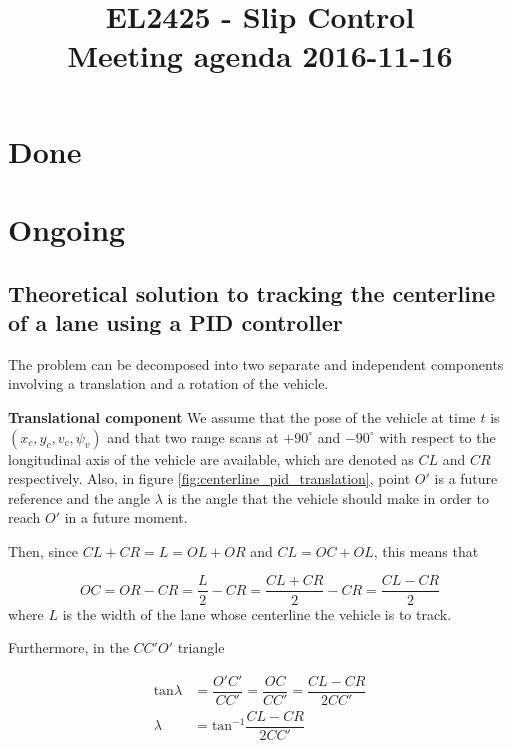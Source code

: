 \documentclass[oneside,12pt]{article}
\title{EL2425 - Slip Control \\ Meeting agenda 2016-11-16}
\begin{document}
\maketitle

\section{Done}




\section{Ongoing}


  \subsection{Theoretical solution to tracking the centerline of a lane using
    a PID controller}

    The problem can be decomposed into two separate and independent
    components involving a translation and a rotation of the vehicle.


    \textbf{Translational component}
    We assume that the pose of the vehicle at time $t$ is
    $(x_c, y_c, v_c, \psi_v)$ and that two range scans at $+90^\circ$ and
    $-90^\circ$ with respect to the longitudinal axis of the
    vehicle are available, which are denoted as $CL$ and $CR$ respectively. Also,
    in figure \ref{fig:centerline_pid_translation}, point $O'$ is a future
    reference and the angle $\lambda$ is the angle that the vehicle should
    make in order to reach $O'$ in a future moment.

    Then, since $CL + CR = L = OL + OR$ and $CL = OC + OL$, this means that

    \begin{equation}
      OC = OR - CR = \dfrac{L}{2} - CR = \dfrac{CL + CR}{2} - CR = \dfrac{CL-CR}{2}
    \end{equation}
    where $L$ is the width of the lane whose centerline the vehicle is to track.

    Furthermore, in the $CC'O'$ triangle

    \begin{align}
      \text{tan}\lambda &= \dfrac{O'C'}{CC'} = \dfrac{OC}{CC'} = \dfrac{CL-CR}{2CC'} \\
      \lambda &= \text{tan}^{-1}\dfrac{CL-CR}{2CC'}
    \end{align}
\end{document}
